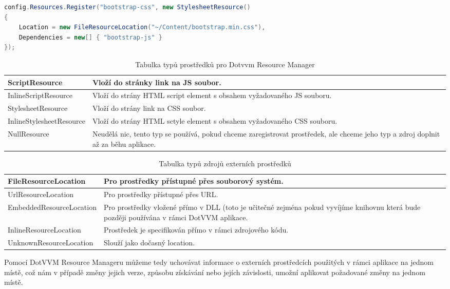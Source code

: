 \begin{lstlisting}[language=c#, caption=Registrace CSS,label=resourceAdd,captionpos=t]
config.Resources.Register("bootstrap-css", new StylesheetResource()
{
    Location = new FileResourceLocation("~/Content/bootstrap.min.css"),
    Dependencies = new[] { "bootstrap-js" }
});
\end{lstlisting}

\begin{table}[H]
	\caption{Tabulka typů prostředků pro Dotvvm Resource Manager}
	\label{resTypeTable}
	\centering
	\begin{tabular}{m{12em}|m{22em}}
		\toprule
ScriptResource           & Vloží do stránky link na JS soubor. \\ \midrule
InlineScriptResource     & Vloží do strány HTML script element s obsahem vyžadovaného JS souboru. \\ \midrule
StylesheetResource       & Vloží do strány link na CSS soubor. \\ \midrule
InlineStylesheetResource & Vloží do strány HTML sctyle element s obsahem vyžadovaného CSS souboru. \\ \midrule
NullResource             & Neudělá nic, tento typ se používá, pokud chceme zaregistrovat prostředek, ale chceme jeho typ a zdroj doplnit až za běhu aplikace. \\
\bottomrule
\end{tabular}
\end{table}

\begin{table}[H]
	\caption{Tabulka typů zdrojů externích prostředků}
	\label{resLocTable}
	\centering
	\begin{tabular}{m{12em}|m{22em}}
		\toprule
FileResourceLocation           & Pro prostředky přístupné přes souborový systém. \\ \midrule
UrlResourceLocation           & Pro prostředky přístupné přes URL.\\ \midrule
EmbeddedResourceLocation           & Pro prostředky vložené přímo v DLL (toto je učitečné zejména pokud vyvíjíme knihovnu která bude později používána v rámci DotVVM aplikace. \\ \midrule
InlineResourceLocation           & Prostředek je specifikován přímo v rámci zdrojového kódu. \\ \midrule
UnknownResourceLocation           & Slouží jako dočasný location. \\
\bottomrule
\end{tabular}
\end{table}
Pomocí DotVVM Resource Manageru můžeme tedy uchovávat informace o externích prostředcích použitých v rámci aplikace na jednom místě, což nám v případě změny jejich verze, způsobu získávání nebo jejích závislosti, umožní aplikovat požadované změny na jednom místě.

